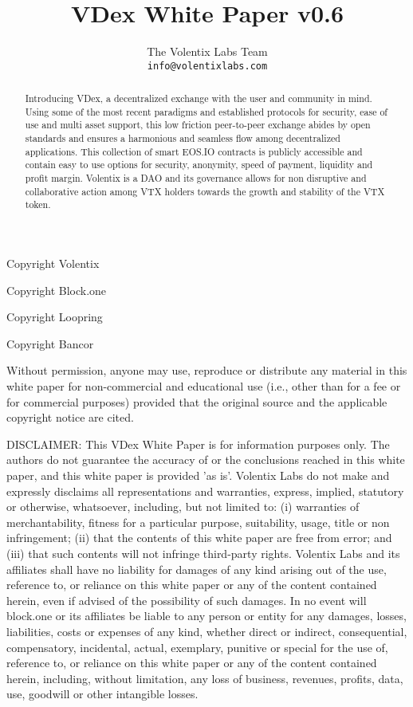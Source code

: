 \documentclass[]{article}
\title{VDex White Paper v0.6}
\author{
		The Volentix Labs Team\\
	\texttt{info@volentixlabs.com}
}
\begin{document}
\tableofcontents
\maketitle
\begin{description}
\item Copyright  Volentix
\item Copyright  Block.one
\item Copyright  Loopring
\item Copyright  Bancor
\end{description}

{\tiny Without permission, anyone may use, reproduce or distribute any material in this white paper for non-commercial and educational use (i.e., other than for a fee or for commercial purposes) provided that the original source and the applicable copyright notice are cited.

DISCLAIMER: This VDex White Paper  is for information purposes only. The authors do not guarantee the accuracy of or the conclusions reached in this white paper, and this white paper is provided 'as is'. 
Volentix Labs do not make and expressly disclaims all representations and warranties, express, implied, statutory or otherwise, whatsoever, including, but not limited to: (i) warranties of merchantability, fitness for a particular purpose, suitability, usage, title or non infringement; (ii) that the contents of this white paper are free from error; and (iii) that such contents will not infringe third-party rights. Volentix Labs and its affiliates shall have no liability for damages of any kind arising out of the use, reference to, or reliance on this white paper or any of the content contained herein, even if advised of the possibility of such damages. In no event will block.one or its affiliates be liable to any person or entity for any damages, losses, liabilities, costs or expenses of any kind, whether direct or indirect, consequential, compensatory, incidental, actual, exemplary, punitive or special for the use of, reference to, or reliance on this white paper or any of the content contained herein, including, without limitation, any loss of business, revenues, profits, data, use, goodwill or other intangible losses.}

\begin{abstract}

Introducing VDex, a decentralized exchange with the user and community in mind. 
Using some of the most recent paradigms and established protocols for security, 
ease of use and multi asset support, this low friction peer-to-peer exchange 
abides by open standards and ensures a harmonious and seamless flow among 
decentralized applications. This collection of smart EOS.IO contracts is publicly accessible 
and contain easy to use options for security, anonymity, speed of payment, liquidity and profit margin.
Volentix is a DAO and its governance allows for non disruptive and collaborative action among VTX holders towards the growth and stability of the VTX token.
\end{abstract}
\end{document}
